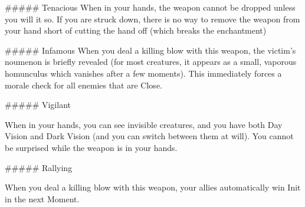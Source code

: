 ##### Tenacious
When in your hands, the weapon cannot be dropped unless you will it so.  If you are struck down, there is no way to remove the weapon from your hand short of cutting the hand off (which breaks the enchantment)


##### Infamous
When you deal a killing blow with this weapon, the victim's noumenon is briefly revealed (for most creatures, it appears as a small, vaporous homunculus which vanishes after a few moments).  This immediately forces a morale check for all enemies that are Close.

##### Vigilant

When in your hands, you can see invisible creatures, and you have both Day Vision and Dark Vision (and you can switch between them at will).  You cannot be surprised while the weapon is in your hands.

##### Rallying

When you deal a killing blow with this weapon, your allies automatically win Init in the next Moment.



